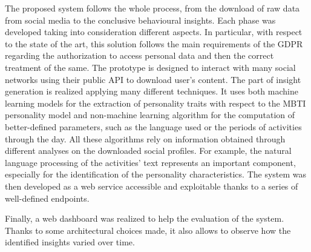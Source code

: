 The proposed system follows the whole process, from the download of raw data from social media to the conclusive behavioural insights. 
Each phase was developed taking into consideration different aspects. In particular, with respect to the state of the art, this solution follows the main requirements of the GDPR regarding the authorization to access personal data and then the correct treatment of the same.
The prototype is designed to interact with many social networks using their public API to download user's content. The part of insight generation is realized applying many different techniques.
It uses both machine learning models for the extraction of personality traits with respect to the MBTI personality model and non-machine learning algorithm for the computation of better-defined parameters, such as the language used or the periods of activities through the day.
All these algorithms rely on information obtained through different analyses on the downloaded social profiles. For example, the natural language processing of the activities' text represents an important component, especially for the identification of the personality characteristics.
The system was then developed as a web service accessible and exploitable thanks to a series of well-defined endpoints.

Finally, a web dashboard was realized to help the evaluation of the system. Thanks to some architectural choices made, it also allows to observe how the identified insights varied over time.
